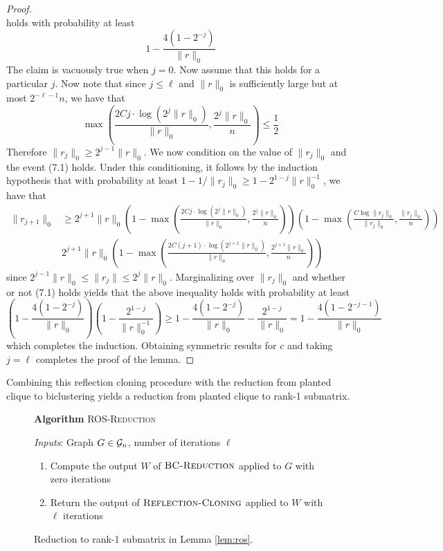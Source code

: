 \begin{proof}
\begin{equation}
\end{equation}
holds with probability at least
$$1 - \frac{4(1 - 2^{-j})}{\| r \|_0}$$
The claim is vacuously true when $j = 0$. Now assume that this holds for a particular $j$. Now note that since $j \le \ell$ and $\| r \|_0$ is sufficiently large but at most $2^{-\ell - 1} n$, we have that
$$\max\left(\frac{2Cj \cdot \log (2^j \| r \|_0)}{\| r \|_0}, \frac{2^j \| r \|_0}{n}\right) \le \frac{1}{2}$$
Therefore $\| r_j \|_0 \ge 2^{j-1} \| r \|_0$. We now condition on the value of $\| r_j \|_0$ and the event (7.1) holds. Under this conditioning, it follows by the induction hypothesis that with probability at least $1 - 1/\| r_j \|_0 \ge 1 - 2^{1-j} \| r\|_0^{-1}$, we have that
\begin{align*}
\| r_{j+1} \|_0 &\ge 2^{j+1} \| r \|_0 \left( 1 - \max\left(\frac{2Cj \cdot \log (2^j \| r \|_0)}{\| r \|_0}, \frac{2^j \| r \|_0}{n}\right) \right) \left(1 - \max\left(\frac{C \log \| r_j \|_0}{\| r_j\|_0}, \frac{\| r_j \|_0}{n}\right) \right) \\
&2^{j+1} \| r \|_0 \left( 1 - \max\left(\frac{2C(j+1) \cdot \log (2^{j+1} \| r \|_0)}{\| r \|_0}, \frac{2^{j+1} \| r \|_0}{n}\right) \right)
\end{align*}
since $2^{j-1} \| r \|_0 \le \| r_j \| \le 2^j \| r \|_0$. Marginalizing over $\| r_j \|_0$ and whether or not (7.1) holds yields that the above inequality holds with probability at least
$$\left( 1 - \frac{4(1 - 2^{-j})}{\| r \|_0} \right) \left( 1 - \frac{2^{1-j}}{\| r \|_0^{-1}} \right) \ge 1 - \frac{4(1 - 2^{-j})}{\| r \|_0} - \frac{2^{1-j}}{\| r \|_0} = 1 - \frac{4(1 - 2^{-j-1})}{\| r \|_0}$$
which completes the induction. Obtaining symmetric results for $c$ and taking $j = \ell$ completes the proof of the lemma.
\end{proof}

Combining this reflection cloning procedure with the reduction from planted clique to biclustering yields a reduction from planted clique to rank-1 submatrix.

\begin{figure}[t!]
\begin{algbox}
\textbf{Algorithm} \textsc{ROS-Reduction}

\vspace{2mm}

\textit{Inputs}: Graph $G \in \mathcal{G}_n$, number of iterations $\ell$
\begin{enumerate}
\item Compute the output $W$ of $\textsc{BC-Reduction}$ applied to $G$ with zero iterations
\item Return the output of $\textsc{Reflection-Cloning}$ applied to $W$ with $\ell$ iterations
\end{enumerate}
\vspace{1mm}
\end{algbox}
\caption{Reduction to rank-1 submatrix in Lemma \ref{lem:ros}.}
\label{fig:ros}
\end{figure}

